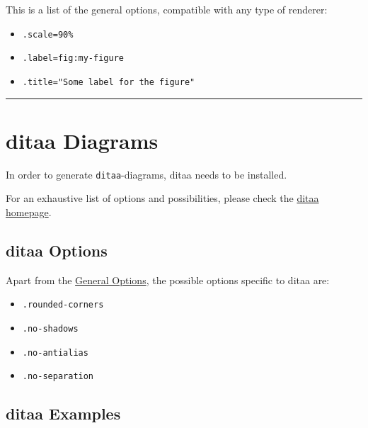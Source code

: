 \documentclass[]{article}
\begin{document}

This is a list of the general options, compatible with any type of
renderer:

\begin{itemize}
\itemsep1pt\parskip0pt
\item
  \texttt{.scale=90\%}
\item
  \texttt{.label=fig:my-figure}
\item
  \texttt{.title="Some label for the figure"}
\end{itemize}

\begin{center}\rule{3in}{0.4pt}\end{center}

\newpage

\section{ditaa Diagrams}\label{ditaa-diagrams}

In order to generate \texttt{ditaa}-diagrams, ditaa needs to be
installed.

For an exhaustive list of options and possibilities, please check the
\href{http://ditaa.sourceforge.net/}{ditaa homepage}.

\subsection{ditaa Options}\label{ditaa-options}

Apart from the \hyperref[general-options]{General Options}, the possible
options specific to ditaa are:

\begin{itemize}
\itemsep1pt\parskip0pt
\item
  \texttt{.rounded-corners}
\item
  \texttt{.no-shadows}
\item
  \texttt{.no-antialias}
\item
  \texttt{.no-separation}
\end{itemize}

\subsection{ditaa Examples}\label{ditaa-examples}
\end{document}
